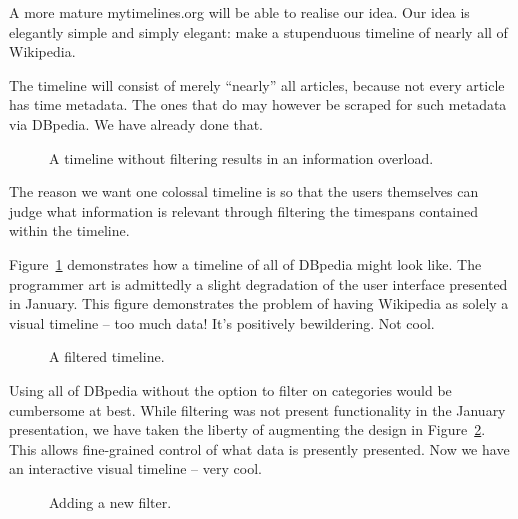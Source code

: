 A more mature mytimelines.org will be able to realise our idea. Our idea is 
elegantly simple and simply elegant: make a stupenduous timeline of nearly all 
of Wikipedia.

The timeline will consist of merely ``nearly'' all articles, because not every 
article has time metadata. The ones that do may however be scraped for such 
metadata via DBpedia. We have already done that.

\begin{figure}[H]
  \centering
  \begin{scale}{0.3}
    
  \end{scale}
  \caption{A timeline without filtering results in an information overload.}
  \label{fig:overload}
\end{figure}

The reason we want one colossal timeline is so that the users themselves can 
judge what information is relevant through filtering the timespans contained 
within the timeline.

Figure~\ref{fig:overload} demonstrates how a timeline of all of DBpedia might 
look like. The programmer art is admittedly a slight degradation of the user 
interface presented in January. This figure demonstrates the problem of having 
Wikipedia as solely a visual timeline -- too much data! It's positively 
bewildering. Not cool.

\begin{figure}[H]
  \centering
  \begin{scale}{0.3}
    
  \end{scale}
  \caption{A filtered timeline.}
  \label{fig:filtered}
\end{figure}

Using all of DBpedia without the option to filter on categories would be
cumbersome at best. While filtering was not present functionality in the
January presentation, we have taken the liberty of augmenting the design in
Figure~\ref{fig:filtered}. This allows fine-grained control of what data is
presently presented. Now we have an interactive visual timeline -- very cool.

\begin{figure}[H]
  \centering
  \begin{scale}{0.5}
    
  \end{scale}
  \caption{Adding a new filter.}
  \label{fig:filters}
\end{figure}

